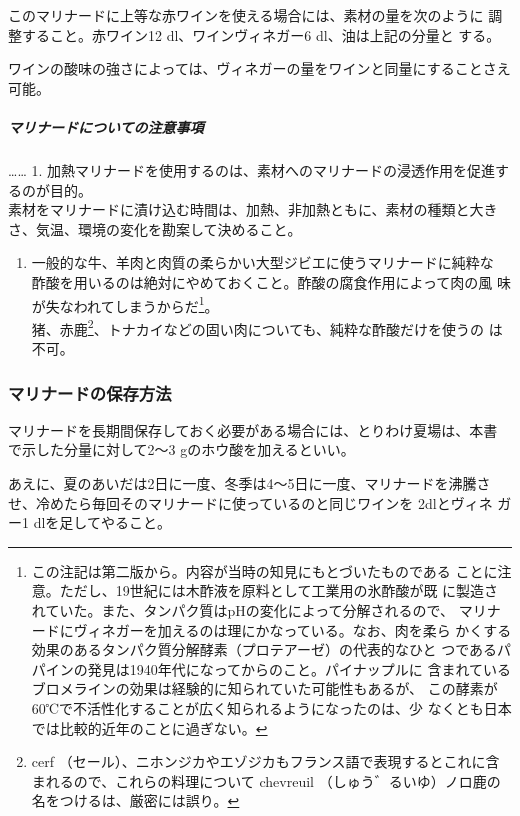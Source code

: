 \begin{recette}
\begin{itemize}
  このマリナードに上等な赤ワインを使える場合には、素材の量を次のように
  調整すること。赤ワイン12 dl、ワインヴィネガー6 dl、油は上記の分量と
  する。

  ワインの酸味の強さによっては、ヴィネガーの量をワインと同量にすることさえ可能。
\end{itemize}

\hypertarget{observation-sur-les-marinades}{%
\subparagraph{マリナードについての注意事項}\label{observation-sur-les-marinades}}

\ldots{}\ldots{} 1.
加熱マリナードを使用するのは、素材へのマリナードの浸透作用を促進するのが目的。\\
素材をマリナードに漬け込む時間は、加熱、非加熱ともに、素材の種類と大き
さ、気温、環境の変化を勘案して決めること。

\begin{enumerate}
\def\labelenumi{\arabic{enumi}.}
\setcounter{enumi}{1}
\tightlist
\item
  一般的な牛、羊肉と肉質の柔らかい大型ジビエに使うマリナードに純粋な
  酢酸を用いるのは絶対にやめておくこと。酢酸の腐食作用によって肉の風
  味が失なわれてしまうからだ\footnote{この注記は第二版から。内容が当時の知見にもとづいたものである
    ことに注意。ただし、19世紀には木酢液を原料として工業用の氷酢酸が既
    に製造されていた。また、タンパク質はpHの変化によって分解されるので、
    マリナードにヴィネガーを加えるのは理にかなっている。なお、肉を柔ら
    かくする効果のあるタンパク質分解酵素（プロテアーゼ）の代表的なひと
    つであるパパインの発見は1940年代になってからのこと。パイナップルに
    含まれているブロメラインの効果は経験的に知られていた可能性もあるが、
    この酵素が60℃で不活性化することが広く知られるようになったのは、少
    なくとも日本では比較的近年のことに過ぎない。}。\\
  猪、赤鹿\footnote{cerf
    （セール）、ニホンジカやエゾジカもフランス語で表現するとこれに含まれるので、これらの料理について
    chevreuil （しゅう゛るいゆ）ノロ鹿の名をつけるは、厳密には誤り。}、トナカイなどの固い肉についても、純粋な酢酸だけを使うの
  は不可。
\end{enumerate}

\hypertarget{conservation-des-marinades}{%
\subsubsection{マリナードの保存方法}\label{conservation-des-marinades}}



マリナードを長期間保存しておく必要がある場合には、とりわけ夏場は、本書
で示した分量に対して2〜3 gのホウ酸を加えるといい。

あえに、夏のあいだは2日に一度、冬季は4〜5日に一度、マリナードを沸騰さ
せ、冷めたら毎回そのマリナードに使っているのと同じワインを 2dlとヴィネ
ガー1 dlを足してやること。
\end{recette}

